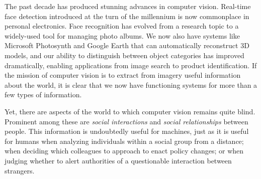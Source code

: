 \pagestyle{plain} 

 \label{sec:intro}



The past decade has produced stunning advances in computer vision. Real-time face detection introduced at the turn of the millennium is now commonplace in personal electronics. Face recognition has evolved from a research topic to a widely-used tool for managing photo albums. We now also have systems like Microsoft Photosynth and Google Earth that can automatically reconstruct 3D models, and our ability to distinguish between object categories has improved dramatically, enabling applications from image search to product identification. If the mission of computer vision is to extract from imagery useful information about the world, it is clear that we now have functioning systems for more than a few types of information. 



Yet, there are aspects of the world to which computer vision remains quite blind. Prominent among these are \emph{social interactions} and \emph{social relationships} between people. This information is undoubtedly useful for machines, just as it is useful for humans when analyzing individuals within a social group from a distance; when deciding which colleagues to approach to enact policy changes; or when judging whether to alert authorities of a questionable interaction between strangers.


